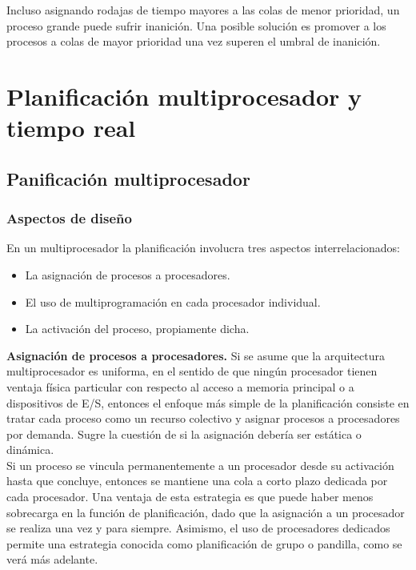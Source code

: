 \documentclass{article}
\begin{document}
				 Incluso asignando rodajas de tiempo mayores a las colas de menor prioridad, un proceso grande puede sufrir inanición. Una posible solución es promover a los procesos a colas de mayor prioridad una vez superen el umbral de inanición.
				 
		\section{Planificación multiprocesador y tiempo real}
			\subsection{Panificación multiprocesador}
				\subsubsection{Aspectos de diseño}
					En un multiprocesador la planificación involucra tres aspectos interrelacionados:
					
					\begin{itemize}
					\item La asignación de procesos a procesadores.
					\item El uso de multiprogramación en cada procesador individual.
					\item La activación del proceso, propiamente dicha.
					\end{itemize}
					
					\textbf{Asignación de procesos a procesadores.} Si se asume que la arquitectura multiprocesador es uniforma, en el sentido de que ningún procesador tienen ventaja física particular con respecto al acceso a memoria principal o a dispositivos de E/S, entonces el enfoque más simple de la planificación consiste en tratar cada proceso como un recurso colectivo y asignar procesos a procesadores por demanda. Sugre la cuestión de si la asignación debería ser estática o dinámica. \\
					
					Si un proceso se vincula permanentemente a un procesador desde su activación hasta que concluye, entonces se mantiene una cola a corto plazo dedicada por cada procesador. Una ventaja de esta estrategia es que puede haber menos sobrecarga en la función de planificación, dado que la asignación a un procesador se realiza una vez y para siempre. Asimismo, el uso de procesadores dedicados permite una estrategia conocida como planificación de grupo o pandilla, como se verá más adelante. \\
					
\end{document}
